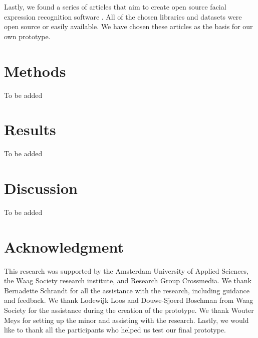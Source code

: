 \documentclass[sigconf]{acmart}
\begin{document}
Lastly, we found a series of articles that aim to create open source facial expression recognition software
\cite{gent2016landmarks}. All of the chosen libraries and datasets were open source or easily available.
We have chosen these articles as the basis for our own prototype.


\section{Methods}
To be added


\section{Results}
To be added


\section{Discussion}
To be added


\section{Acknowledgment}
This research was supported by the Amsterdam University of Applied Sciences, the Waag Society research
institute, and Research Group Crossmedia. We thank Bernadette Schrandt for all the assistance
with the research, including guidance and feedback. We thank Lodewijk Loos and Douwe-Sjoerd Boschman 
from Waag Society for the assistance during the creation of the prototype. We thank Wouter Meys for setting
up the minor and assisting with the research. Lastly, we would like to thank all the participants who helped
us test our final prototype.





\end{document}
